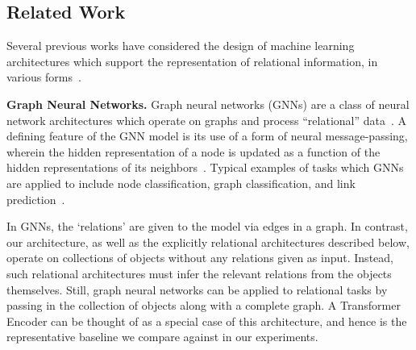 \subsection{Related Work}

Several previous works have considered the design of machine learning architectures which support the representation of relational information, in various forms~\citep{battagliaRelationalInductiveBiases2018,zambaldiDeepReinforcementLearning2018,kipfNeuralRelationalInference2018,santoroSimpleNeural2017,santoroRelationalRecurrent2018,palmRecurrentRelationalNetworks2018,zhangRAVENDatasetRelational2019,webbEmergentSymbols2021,kergNeuralArchitecture2022}.


\textbf{Graph Neural Networks.} Graph neural networks (GNNs) are a class of neural network architectures which operate on graphs and process ``relational'' data~\citep{gilmerNeuralMessagePassing2017,niepertLearningConvolutionalNeural2016,kipfSemiSupervisedClassificationGraph2017,schlichtkrullModelingRelationalData2017,velickovicGraphAttentionNetworks2017}. A defining feature of the GNN model is its use of a form of neural message-passing, wherein the hidden representation of a node is updated as a function of the hidden representations of its neighbors~\citep{gilmerNeuralMessagePassing2017}. Typical examples of tasks which GNNs are applied to include node classification, graph classification, and link prediction~\citep{hamiltonGraphRepresentationLearning2020}. %

In GNNs, the `relations' are given to the model via edges in a graph. In contrast, our architecture, as well as the explicitly relational architectures described below, operate on collections of objects without any relations given as input. Instead, such relational architectures must infer the relevant relations from the objects themselves. Still, graph neural networks can be applied to relational tasks by passing in the collection of objects along with a complete graph. A Transformer Encoder can be thought of as a special case of this architecture, and hence is the representative baseline we compare against in our experiments.

